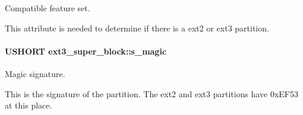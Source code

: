 Compatible feature set.

This attribute is needed to determine if there is a ext2 or ext3 partition.\hypertarget{structext3__super__block_m15}{
\paragraph[s\_\-magic]{\setlength{\rightskip}{0pt plus 5cm}USHORT ext3\_\-super\_\-block::s\_\-magic}\hfill}
\label{structext3__super__block_m15}


Magic signature.

This is the signature of the partition. The ext2 and ext3 partitions have 0x\-EF53 at this place.